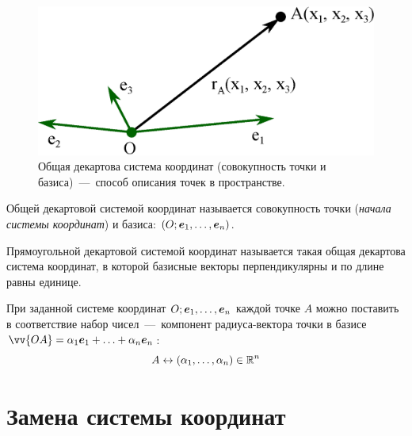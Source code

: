 \documentclass[a4paper,12pt]{article}
\begin{document}
  \begin{figure}[h]
    \centering
    
    \includegraphics[width=0.5\columnwidth]{coord-system}
    
    \caption{Общая декартова система координат (совокупность точки и базиса)~---~способ описания точек в пространстве.}
    \label{fig:coord-system}
  \end{figure}
  
  \begin{definition}
    Общей декартовой системой координат называется совокупность точки (\emph{начала системы координат}) и базиса: $(O; \boldsymbol e_1, \ldots, \boldsymbol e_n)$.
  \end{definition}
  
  \begin{definition}
    Прямоугольной декартовой системой координат называется такая общая декартова система координат, в которой базисные векторы перпендикулярны и по длине равны единице.
  \end{definition}
  
  \begin{remark}
    При заданной системе координат $O; \boldsymbol e_1, \ldots, \boldsymbol e_n$ каждой точке $A$ можно поставить в соответствие набор чисел~---~компонент радиуса-вектора точки в базисе $\vv{OA} \hm= \alpha_1 \bds e_1 \hm+ \ldots \hm+ \alpha_n \bds e_n$:
    \[
      A \leftrightarrow (\alpha_1, \ldots, \alpha_n) \in \operatorname{\mathbb R}^n
    \]
  \end{remark}
  
  
  \section{Замена системы координат}
\end{document}
